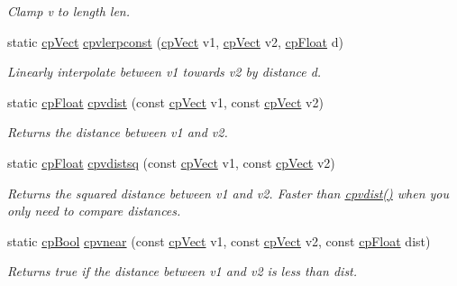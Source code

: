 \begin{DoxyCompactItemize}
\begin{DoxyCompactList}\small\item\em Clamp v to length len. \end{DoxyCompactList}\item 
\hypertarget{group__cp_vect_gaaf91d2bdafb741a35ab2dc6300d9fa81}{}static \hyperlink{structcp_vect}{cp\+Vect} \hyperlink{group__cp_vect_gaaf91d2bdafb741a35ab2dc6300d9fa81}{cpvlerpconst} (\hyperlink{structcp_vect}{cp\+Vect} v1, \hyperlink{structcp_vect}{cp\+Vect} v2, \hyperlink{group__basic_types_gac1ed65573e035bf892505768c852d8d3}{cp\+Float} d)\label{group__cp_vect_gaaf91d2bdafb741a35ab2dc6300d9fa81}

\begin{DoxyCompactList}\small\item\em Linearly interpolate between v1 towards v2 by distance d. \end{DoxyCompactList}\item 
\hypertarget{group__cp_vect_ga07488fb10c3ffb842b78ae66a2d90c00}{}static \hyperlink{group__basic_types_gac1ed65573e035bf892505768c852d8d3}{cp\+Float} \hyperlink{group__cp_vect_ga07488fb10c3ffb842b78ae66a2d90c00}{cpvdist} (const \hyperlink{structcp_vect}{cp\+Vect} v1, const \hyperlink{structcp_vect}{cp\+Vect} v2)\label{group__cp_vect_ga07488fb10c3ffb842b78ae66a2d90c00}

\begin{DoxyCompactList}\small\item\em Returns the distance between v1 and v2. \end{DoxyCompactList}\item 
\hypertarget{group__cp_vect_gadb0ce5353909318beb7ee3163f7c3152}{}static \hyperlink{group__basic_types_gac1ed65573e035bf892505768c852d8d3}{cp\+Float} \hyperlink{group__cp_vect_gadb0ce5353909318beb7ee3163f7c3152}{cpvdistsq} (const \hyperlink{structcp_vect}{cp\+Vect} v1, const \hyperlink{structcp_vect}{cp\+Vect} v2)\label{group__cp_vect_gadb0ce5353909318beb7ee3163f7c3152}

\begin{DoxyCompactList}\small\item\em Returns the squared distance between v1 and v2. Faster than \hyperlink{group__cp_vect_ga07488fb10c3ffb842b78ae66a2d90c00}{cpvdist()} when you only need to compare distances. \end{DoxyCompactList}\item 
\hypertarget{group__cp_vect_ga2ffc18e3b7405c28e92b6aa0f6cad746}{}static \hyperlink{group__basic_types_gabc5e752c48f3449ca26ef413ecbd647e}{cp\+Bool} \hyperlink{group__cp_vect_ga2ffc18e3b7405c28e92b6aa0f6cad746}{cpvnear} (const \hyperlink{structcp_vect}{cp\+Vect} v1, const \hyperlink{structcp_vect}{cp\+Vect} v2, const \hyperlink{group__basic_types_gac1ed65573e035bf892505768c852d8d3}{cp\+Float} dist)\label{group__cp_vect_ga2ffc18e3b7405c28e92b6aa0f6cad746}

\begin{DoxyCompactList}\small\item\em Returns true if the distance between v1 and v2 is less than dist. \end{DoxyCompactList}\end{DoxyCompactItemize}
